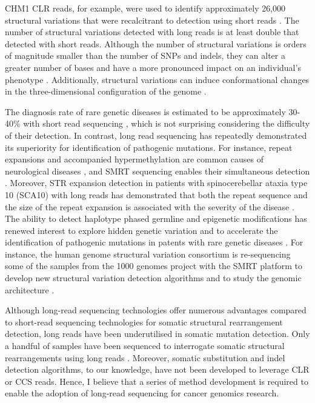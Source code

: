 CHM1 CLR reads, for example, were used to identify approximately 26,000 structural variations that were recalcitrant to detection using short reads \cite{Chaisson2015-zz}. The number of structural variations detected with long reads is at least double that detected with short reads. Although the number of structural variations is orders of magnitude smaller than the number of SNPs and indels, they can alter a greater number of bases and have a more pronounced impact on an individual's phenotype \cite{Weischenfeldt2013-tl}. Additionally, structural variations can induce conformational changes in the three-dimensional configuration of the genome \cite{Spielmann2018-fm}.

The diagnosis rate of rare genetic diseases is estimated to be approximately 30-40\% with short read sequencing \cite{Wright2023-et}, which is not surprising considering the difficulty of their detection. In contrast, long read sequencing has repeatedly demonstrated its superiority for identification of pathogenic mutations. For instance, repeat expansions and accompanied hypermethylation are common causes of neurological diseases \cite{Zhou2022-ci}, and SMRT sequencing enables their simultaneous detection \cite{Loomis2013-ca}. Moreover, STR expansion detection in patients with spinocerebellar ataxia type 10 (SCA10) with long reads has demonstrated that both the repeat sequence and the size of the repeat expansion is associated with the severity of the disease \cite{McFarland2015-qh}. The ability to detect haplotype phased germline and epigenetic modifications has renewed interest to explore hidden genetic variation and to accelerate the identification of pathogenic mutations in patents with rare genetic diseases \cite{Miller2021-lt}. For instance, the human genome structural variation consortium is re-sequencing some of the samples from the 1000 genomes project with the SMRT platform to develop new structural variation detection algorithms and to study the genomic architecture \cite{Ebert2021-zk}. 

Although long-read sequencing technologies offer numerous advantages compared to short-read sequencing technologies for somatic structural rearrangement detection, long reads have been underutilised in somatic mutation detection. Only a handful of samples have been sequenced to interrogate somatic structural rearrangements using long reads \cite{Nattestad2018-tr, Sakamoto2020-nq, Fujimoto2021-kc}. Moreover, somatic substitution and indel detection algorithms, to our knowledge, have not been developed to leverage CLR or CCS reads. Hence, I believe that a series of method development is required to enable the adoption of long-read sequencing for cancer genomics research. 


